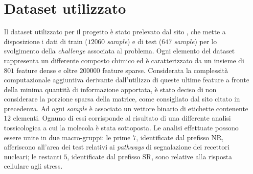 \section{Dataset utilizzato}
Il dataset utilizzato per il progetto è stato prelevato dal sito \cite{dataset_site}, che mette a disposizione i dati di train ($12060$ \textit{sample}) e di test ($647$ \textit{sample}) per lo svolgimento della \textit{challenge} associata al problema.
Ogni elemento del dataset rappresenta un differente composto chimico ed è caratterizzato da un insieme di $801$ feature dense e oltre $200000$ feature sparse. Considerata la complessità computazionale aggiuntiva derivante dall'utilizzo di queste ultime feature a fronte della minima quantità di informazione apportata, è stato deciso di non considerare la porzione sparsa della matrice, come consigliato dal sito citato in precedenza.
Ad ogni \textit{sample} è associato un vettore binario di etichette contenente $12$ elementi.
Ognuno di essi corrisponde al risultato di una differente analisi tossicologica a cui la molecola è stata sottoposta. Le analisi effettuate possono essere unite in due macro-gruppi: le prime $7$, identificate dal prefisso NR, afferiscono all'area dei test relativi ai \textit{pathways} di segnalazione dei recettori nucleari; le restanti $5$, identificate dal prefisso SR, sono relative alla risposta cellulare agli stress.

